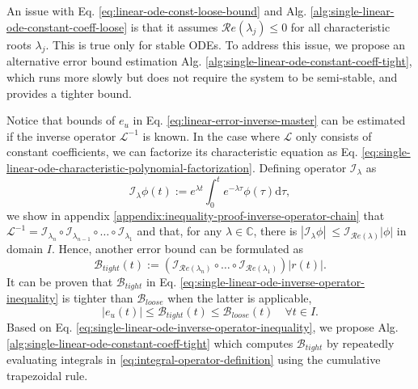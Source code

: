 \documentclass[accepted]{uai2023}
\newcommand{\Err}{e}
\newcommand{\Bound}{\mathcal{B}}
\renewcommand{\L}{\mathcal{L}}
\newcommand{\I}{\mathcal{I}}
\renewcommand{\Re}[1]{\mathcal{R}e\left(#1\right)}
\begin{document}
    An issue with Eq. \ref{eq:linear-ode-const-loose-bound} and Alg. \ref{alg:single-linear-ode-constant-coeff-loose} is that it assumes $\Re{\lambda_j} \leq 0$ for all characteristic roots $\lambda_j$. 
    This is true only for stable ODEs. 
    To address this issue, we propose an alternative error bound estimation Alg. \ref{alg:single-linear-ode-constant-coeff-tight}, which runs more slowly but does not require the system to be semi-stable, and provides a tighter bound.

    Notice that bounds of $\Err_u$ in Eq. \ref{eq:linear-error-inverse-master} can be estimated if the inverse operator $\L^{-1}$ is known. 
    In the case where $\L$ only consists of constant coefficients, we can factorize its characteristic equation as Eq. \ref{eq:single-linear-ode-characteristic-polynomial-factorization}.
    Defining operator $\I_{\lambda}$ as 
    \begin{equation} \label{eq:integral-operator-definition}
        \I_\lambda \phi(t) := e^{{\lambda} t} \int_{0}^{t} e^{-{\lambda} \tau} \phi(\tau) \mathrm{d}\tau,
    \end{equation}
    we show in appendix \ref{appendix:inequality-proof-inverse-operator-chain} that $\L^{-1} = \I_{\lambda_{n}} \circ \I_{\lambda_{n-1}} \circ \dots \circ \I_{\lambda_1}$ and that, for any $\lambda \in \mathbb{C}$, there is $\left|\I_{\lambda} \phi\right| \ \leq \I_{\Re{\lambda}} |\phi|$ in domain $I$.
    Hence, another error bound can be formulated as
    \begin{equation} \label{eq:single-linear-ode-inverse-operator-inequality}
        \Bound_{tight}(t) := \left(\I_{\Re{\lambda_{n}}} \circ \dots \circ \I_{\Re{\lambda_1}}\right) |r(t)|.
    \end{equation}
    It can be proven that $\Bound_{tight}$ in Eq. \ref{eq:single-linear-ode-inverse-operator-inequality} is tighter than $\Bound_{loose}$ when the latter is applicable,
    \begin{equation}
        \left|\Err_u(t)\right| \leq \Bound_{tight}(t) \leq \Bound_{loose}(t) \quad \forall t \in I.
    \end{equation}
    Based on Eq. \ref{eq:single-linear-ode-inverse-operator-inequality}, we propose Alg. \ref{alg:single-linear-ode-constant-coeff-tight} which computes $\Bound_{tight}$ by repeatedly evaluating integrals in \ref{eq:integral-operator-definition} using the cumulative trapezoidal rule.
\end{document}
